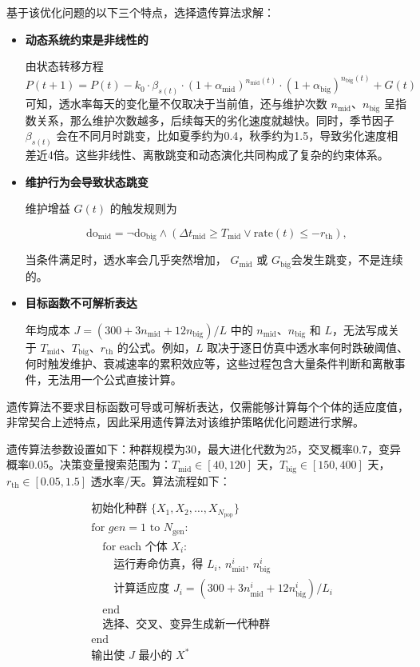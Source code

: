 \documentclass[withoutpreface,bwprint]{cumcmthesis}
\begin{document}
基于该优化问题的以下三个特点，选择遗传算法求解：
\begin{itemize}
	\item \textbf{动态系统约束是非线性的}
	
	由状态转移方程 $P(t+1) = P(t) - k_0 \cdot \beta_{s(t)} \cdot (1+\alpha_{\text{mid}})^{n_{\text{mid}}(t)} \cdot (1+\alpha_{\text{big}})^{n_{\text{big}}(t)} + G(t)$ 可知，透水率每天的变化量不仅取决于当前值，还与维护次数 $n_{\text{mid}}$、$n_{\text{big}}$ 呈指数关系，那么维护次数越多，后续每天的劣化速度就越快。同时，季节因子 $\beta_{s(t)}$ 会在不同月时跳变，比如夏季约为0.4，秋季约为1.5，导致劣化速度相差近4倍。这些非线性、离散跳变和动态演化共同构成了复杂的约束体系。
	
	\item \textbf{维护行为会导致状态跳变}
	
	维护增益 $G(t)$ 的触发规则为 
	
	\vspace*{-10pt}
	\[\text{do}_{\text{mid}} = \neg \text{do}_{\text{big}} \land \left( \Delta t_{\text{mid}} \geq T_{\text{mid}} \lor \text{rate}(t) \leq -r_{\text{th}} \right),\]
	\vspace*{-20pt}
	
	当条件满足时，透水率会几乎突然增加， $G_{\text{mid}}$ 或 $G_{\text{big}}$会发生跳变，不是连续的。
	
	\item \textbf{目标函数不可解析表达}
	
	年均成本 $J = (300 + 3n_{\text{mid}} + 12n_{\text{big}}) / L$ 中的 $n_{\text{mid}}$、$n_{\text{big}}$ 和 $L$，无法写成关于 $T_{\text{mid}}$、$T_{\text{big}}$、$r_{\text{th}}$ 的公式。例如，$L$ 取决于逐日仿真中透水率何时跌破阈值、何时触发维护、衰减速率的累积效应等，这些过程包含大量条件判断和离散事件，无法用一个公式直接计算。
\end{itemize}

遗传算法不要求目标函数可导或可解析表达，仅需能够计算每个个体的适应度值，非常契合上述特点，因此采用遗传算法对该维护策略优化问题进行求解。

遗传算法参数设置如下：种群规模为30，最大进化代数为25，交叉概率0.7，变异概率0.05。决策变量搜索范围为：$T_{\text{mid}} \in [40, 120]$ 天，$T_{\text{big}} \in [150, 400]$ 天，$r_{\text{th}} \in [0.05, 1.5]$ 透水率/天。算法流程如下：

\vspace*{-15pt}
\[
	\begin{aligned}
		& \text{初始化种群 } \{X_1, X_2, \ldots, X_{N_{\text{pop}}}\} \\
		& \text{for } gen = 1 \text{ to } N_{\text{gen}}: \\
		& \quad \text{for each 个体 } X_i: \\
		& \quad \quad \text{运行寿命仿真，得 } L_i,\ n_{\text{mid}}^i,\ n_{\text{big}}^i \\
		& \quad \quad \text{计算适应度 } J_i = (300 + 3n_{\text{mid}}^i + 12n_{\text{big}}^i) / L_i \\
		& \quad \text{end} \\
		& \quad \text{选择、交叉、变异生成新一代种群} \\
		& \text{end} \\
		& \text{输出使 } J \text{ 最小的 } X^*
	\end{aligned}
\]
\end{document}
